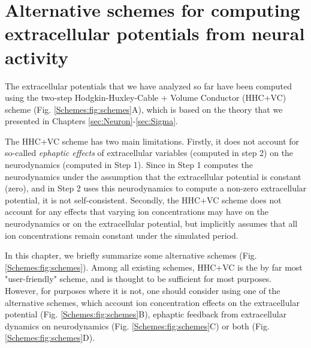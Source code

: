 \section{Alternative schemes for computing extracellular potentials from neural activity}
\label{sec:Schemes}

The extracellular potentials that we have analyzed so far have been computed using the two-step Hodgkin-Huxley-Cable + Volume Conductor (HHC+VC) scheme (Fig. \ref{Schemes:fig:schemes}A), which is based on the theory that we presented in Chapters \ref{sec:Neuron}-\ref{sec:Sigma}. 

The HHC+VC scheme has two main limitations. Firstly, it does not account for so-called \textit{ephaptic effects} of extracellular variables (computed in step 2) on the neurodynamics (computed in Step 1). Since in Step 1 computes the neurodynamics under the assumption that the extracellular potential is constant (zero), and in Step 2 uses this neurodynamics to compute a non-zero extracellular potential, it is not self-consistent. Secondly, the HHC+VC scheme does not account for any effects that varying ion concentrations may have on the neurodynamics or on the extracellular potential, but implicitly assumes that all ion concentrations remain constant under the simulated period. 

In this chapter, we briefly summarize some alternative schemes (Fig. \ref{Schemes:fig:schemes}).
Among all existing schemes, HHC+VC is the by far most "user-friendly" scheme, and is thought to be sufficient for most purposes. However, for purposes where it is not, one should consider using one of the alternative schemes, which account ion concentration effects on the extracellular potential (Fig. \ref{Schemes:fig:schemes}B), ephaptic feedback from extracellular dynamics on neurodynamics (Fig. \ref{Schemes:fig:schemes}C) or both (Fig. \ref{Schemes:fig:schemes}D).


